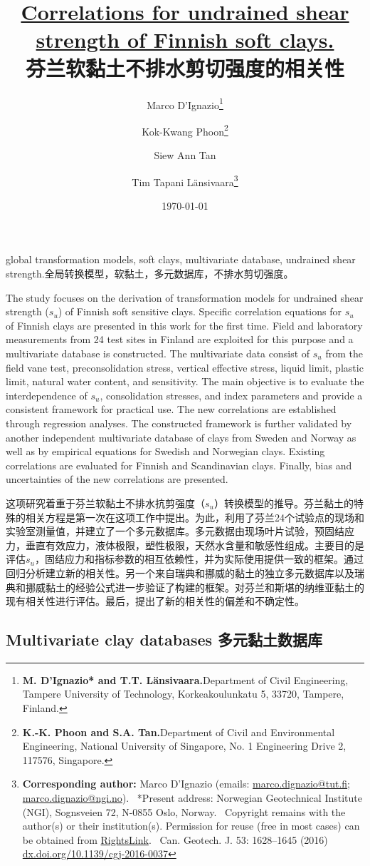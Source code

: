 \documentclass{bilidoc}
\title{\textbf{\href{http://dx.doi.org/10.1139/cgj-2016-0037}{Correlations for undrained shear strength of Finnish soft clays.}\\芬兰软黏土不排水剪切强度的相关性}}
\date{\today}
\author{Marco D’Ignazio\thanks{
    \textbf{M. D’Ignazio* and T.T. Länsivaara.}Department of Civil Engineering, Tampere University of Technology, Korkeakoulunkatu 5, 33720, Tampere, Finland.
} \and Kok-Kwang Phoon\thanks{
    \textbf{K.-K. Phoon and S.A. Tan.}Department of Civil and Environmental Engineering, National University of Singapore, No. 1 Engineering Drive 2, 117576, Singapore.
} \and Siew Ann Tan \and Tim Tapani Länsivaara\thanks{
    \textbf{Corresponding author:} Marco D’Ignazio (emails: \url{marco.dignazio@tut.ﬁ}; \url{marco.dignazio@ngi.no}).\newline{}
    \indent{}~*Present address: Norwegian Geotechnical Institute (NGI), Sognsveien 72, N-0855 Oslo, Norway.\newline{}
    \indent{}~Copyright remains with the author(s) or their institution(s). Permission for reuse (free in most cases) can be obtained from \href{https://www.nrcresearchpress.com/page/authors/services/reprints}{RightsLink}.\newline{}\newline{}
    \indent{}~Can. Geotech. J. 53: 1628–1645 (2016) \href{http://dx.doi.org/10.1139/cgj-2016-0037}{dx.doi.org/10.1139/cgj-2016-0037}
}}
\begin{document}
\maketitle

\begin{Abstract}{global transformation models, soft clays, multivariate database, undrained shear strength.}{全局转换模型，软黏土，多元数据库，不排水剪切强度。}

    The study focuses on the derivation of transformation models for undrained shear strength ($s_u$) of Finnish soft sensitive clays. Speciﬁc correlation equations for $s_u$ of Finnish clays are presented in this work for the ﬁrst time. Field and laboratory measurements from 24 test sites in Finland are exploited for this purpose and a multivariate database is constructed. The multivariate data consist of $s_u$ from the ﬁeld vane test, preconsolidation stress, vertical effective stress, liquid limit, plastic limit, natural water content, and sensitivity. The main objective is to evaluate the interdependence of $s_u$, consolidation stresses, and index parameters and provide a consistent framework for practical use. The new correlations are established through regression analyses. The constructed framework is further validated by another independent multivariate database of clays from Sweden and Norway as well as by empirical equations for Swedish and Norwegian clays. Existing correlations are evaluated for Finnish and Scandinavian clays. Finally, bias and uncertainties of the new correlations are presented.

    \switchcolumn
    
    这项研究着重于芬兰软黏土不排水抗剪强度（$s_u$）转换模型的推导。芬兰黏土的特殊的相关方程是第一次在这项工作中提出。为此，利用了芬兰24个试验点的现场和实验室测量值，并建立了一个多元数据库。多元数据由现场叶片试验，预固结应力，垂直有效应力，液体极限，塑性极限，天然水含量和敏感性组成。主要目的是评估$s_u$，固结应力和指标参数的相互依赖性，并为实际使用提供一致的框架。通过回归分析建立新的相关性。另一个来自瑞典和挪威的黏土的独立多元数据库以及瑞典和挪威黏土的经验公式进一步验证了构建的框架。对芬兰和斯堪的纳维亚黏土的现有相关性进行评估。最后，提出了新的相关性的偏差和不确定性。

\end{Abstract}






\begin{appendix}
    \section{Multivariate clay databases 多元黏土数据库}\label{appendix:a}
\end{appendix}




\end{document}
